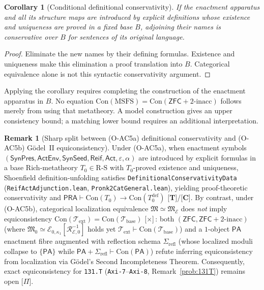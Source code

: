 \documentclass[11pt]{article}
\theoremstyle{plain}
\newtheorem{corollary}[theorem]{Corollary}
\theoremstyle{definition}
\newtheorem{remark}[theorem]{Remark}
\newcommand{\RS}{\mathrm{R\text{-}S}}
\newcommand{\fM}{\mathfrak{M}}
\newcommand{\Con}{\mathrm{Con}}
\newcommand{\PA}{\mathsf{PA}}
\newcommand{\ZFC}{\mathsf{ZFC}}
\newcommand{\cE}{\mathcal{E}}
\begin{document}
\begin{corollary}[Conditional definitional conservativity]\label{cor:ac-oc-conservativity}
If the enactment apparatus and all its structure maps are introduced by explicit definitions whose existence and uniqueness are proved in a fixed base $B$, adjoining their names is conservative over $B$ for sentences of its original language.
\end{corollary}
\begin{proof}
Eliminate the new names by their defining formulas. Existence and uniqueness make this elimination a proof translation into $B$. Categorical equivalence alone is not this syntactic conservativity argument.
\end{proof}
Applying the corollary requires completing the construction of the enactment apparatus in $B$. No equation $\Con(\mathrm{MSFS})=\Con(\ZFC+2\text{-inacc})$ follows merely from using that metatheory. A model construction gives an upper consistency bound; a matching lower bound requires an additional interpretation.

\begin{remark}[Sharp split between \textup{(O-AC5a)} definitional conservativity and \textup{(O-AC5b)} G\"odel~II equiconsistency]\label{rem:oac5-godel-split}
Under \textup{(O-AC5a)}, when enactment symbols $(\mathsf{SynPres}, \mathsf{ActEnv}, \mathsf{SynSeed}, \mathsf{Reif}, \mathsf{Act}, \varepsilon, \alpha)$ are introduced by explicit formulas in a base Rich-metatheory $T_0 \in \RS$ with $T_0$-proved existence and uniqueness, Shoenfield definition-unfolding satisfies \texttt{DefinitionalConservativityData} (\texttt{ReifActAdjunction.lean}, \texttt{Pronk2CatGeneral.lean}), yielding proof-theoretic conservativity and $\mathsf{PRA} \vdash \Con(T_0) \to \Con(T_0^{\mathrm{def}})$ \textup{[\textbf{T}]/[\textbf{C}]}. By contrast, under \textup{(O-AC5b)}, categorical localization equivalence $\fM \simeq \fM_\cE$ does \emph{not} imply equiconsistency $\Con(\mathcal{T}_{\mathrm{ext}}) = \Con(\mathcal{T}_{\mathrm{base}})$ \textup{[\textbf{$\times$}]}\,: both $(\ZFC, \ZFC+2\text{-}\mathrm{inacc})$ (where $\fM_0 \simeq \cE_{0,\kappa_1}[\mathcal{R}_{\cE,0}^{-1}]$ holds yet $\mathcal{T}_{\mathrm{ext}} \vdash \Con(\mathcal{T}_{\mathrm{base}})$) and a $1$-object $\PA$ enactment fibre augmented with reflection schema $\Sigma_{\mathrm{refl}}$ (whose localized moduli collapse to $\{\PA\}$ while $\PA + \Sigma_{\mathrm{refl}} \vdash \Con(\PA)$) refute inferring equiconsistency from localization via G\"odel's Second Incompleteness Theorem. Consequently, exact equiconsistency for \texttt{131.T} (\texttt{Axi-7}--\texttt{Axi-8}, Remark~\ref{prob:131T}) remains open \textup{[\textbf{$\Pi$}]}.
\end{remark}
\end{document}
